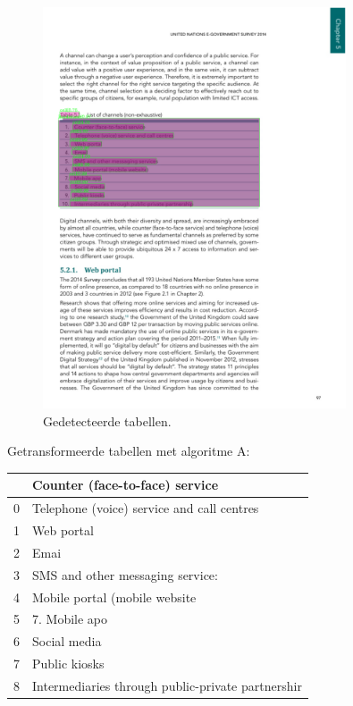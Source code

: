 \begin{figure}[H]
    \centering
    \includegraphics[width=0.8\textwidth]{test-resultaten/1/detected_tables.png}
    \caption{Gedetecteerde tabellen.}
\end{figure}

Getransformeerde tabellen met algoritme A:

\begin{tabular}{ll}
\toprule
{} &                     Counter (face-to-face) service \\
\midrule
0 &         Telephone (voice) service and call centres \\
1 &                                         Web portal \\
2 &                                               Emai \\
3 &                   SMS and other messaging service: \\
4 &                      Mobile portal (mobile website \\
5 &                                      7. Mobile apo \\
6 &                                       Social media \\
7 &                                      Public kiosks \\
8 &  Intermediaries through public-private partnershir \\
\bottomrule
\end{tabular}

